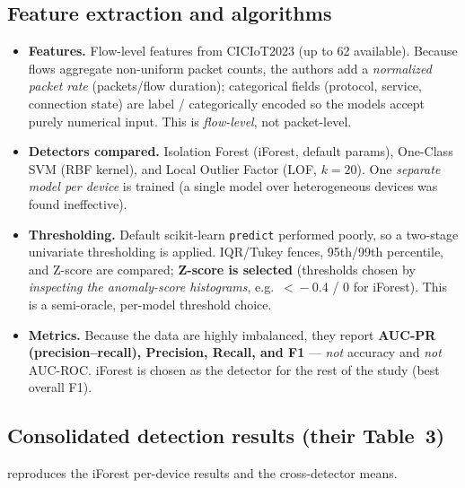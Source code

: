 \documentclass[10pt]{article}
\begin{document}
\subsection{Feature extraction and algorithms}
\begin{itemize}
\item \textbf{Features.} Flow-level features from CICIoT2023 (up to 62 available). Because
flows aggregate non-uniform packet counts, the authors add a \emph{normalized packet rate}
(packets/flow duration); categorical fields (protocol, service, connection state) are label
/ categorically encoded so the models accept purely numerical input. This is
\emph{flow-level}, not packet-level.
\item \textbf{Detectors compared.} Isolation Forest (iForest, default params), One-Class SVM
(RBF kernel), and Local Outlier Factor (LOF, $k{=}20$). One \emph{separate model per device}
is trained (a single model over heterogeneous devices was found ineffective).
\item \textbf{Thresholding.} Default scikit-learn \texttt{predict} performed poorly, so a
two-stage univariate thresholding is applied. IQR/Tukey fences, 95th/99th percentile, and
Z-score are compared; \textbf{Z-score is selected} (thresholds chosen by \emph{inspecting the
anomaly-score histograms}, e.g.\ $<\!-0.4$ / $0$ for iForest). This is a semi-oracle,
per-model threshold choice.
\item \textbf{Metrics.} Because the data are highly imbalanced, they report
\textbf{AUC-PR (precision--recall), Precision, Recall, and F1} --- \emph{not} accuracy and
\emph{not} AUC-ROC. iForest is chosen as the detector for the rest of the study (best overall
F1).
\end{itemize}

\subsection{Consolidated detection results (their Table~3)}
 reproduces the iForest per-device results and the cross-detector means.
\end{document}
